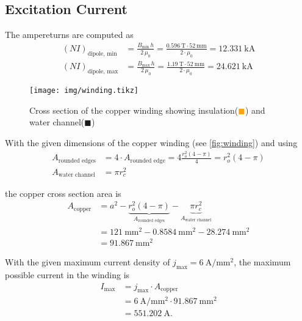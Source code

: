 \documentclass[10pt,a4paper,noendnumber=true]{scrartcl}
\begin{document}
\subsection{Excitation Current}
The ampereturns are computed as
\begin{align}
    (NI)_\text{dipole, min} &= \frac{B_\text{min}\,h}{2\,\mu_0} = \frac{\SI{0.596}{\tesla} \cdot \SI{52}{\mm}}{2\cdot \mu_0} = \SI{12.331}{\kilo\ampere}\\
    (NI)_\text{dipole, max} &= \frac{B_\text{max}\,h}{2\,\mu_0} = \frac{\SI{1.19}{\tesla} \cdot \SI{52}{\mm}}{2\cdot \mu_0} = \SI{24.621}{\kilo\ampere}
\end{align}

\begin{figure}[H]
\centering
\texttt{[image: img/winding.tikz]}
\caption{Cross section of the copper winding showing  insulation(\textcolor{orange}{$\blacksquare$}) and water channel(\textcolor{blue!20}{$\blacksquare$})}
\label{fig:winding}
\end{figure}

With the given dimensions of the copper winding (see \autoref{fig:winding}) and using 
\begin{align}
A_\text{rounded edges} &= 4 \cdot  A_\text{rounded edge} = 4 \frac{r_o^2 (4-\pi)}{4} = r_o^2(4-\pi) \\
A_\text{water channel} &= \pi r_c^2
\end{align}

the copper cross section area is
\begin{align}
	A_\text{copper} & = a^2 - \underbrace{r_o^2(4-\pi)}_{A_\text{rounded edges}} - \underbrace{\pi r_c^2}_{A_\text{water channel}} \\
	  & = \SI{121}{\mm\squared} - \SI{0.8584}{\mm\squared} - \SI{28.274}{\mm\squared} \nonumber                      \\
	  & = \SI{91.867}{\mm\squared} \nonumber
\end{align}

With the given maximum current density of $j_\text{max}=\SI{6}{\ampere\per\mm\squared}$, the maximum possible current in the winding is
\begin{align}
I_\text{max} &= j_\text{max} \cdot A_\text{copper} \\
 &=\SI{6}{\ampere\per\mm\squared} \cdot \SI{91.867}{\mm\squared} \nonumber\\ 
 &= \SI{551.202}{\ampere}. \nonumber
\end{align}
\end{document}
